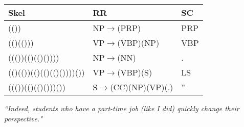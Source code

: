 \begin{frame}
{\begin{center}
    \begin{tabular}{|l|l|l|}
        \hline
        \textbf{Skel} & \textbf{RR }& \textbf{SC }\\
        \hline
         (())                      & NP$\rightarrow$(PRP)         &  PRP\\
          (()(()))                 & VP$\rightarrow$(VBP)(NP)     &  VBP\\
         ((())(()(()())))          & NP$\rightarrow$(NN)          &  .  \\
          (()(())(()(()(()())))()) & VP$\rightarrow$(VBP)(S)      &  LS \\
          ((())(()(()()))())       & S$\rightarrow$(CC)(NP)(VP)(.)&  '' \\
        \hline
    \end{tabular}
    \end{center}}

    {\normalsize
    \emph{``Indeed, students who have a part-time job (like I did) quickly
change their perspective."}}
\end{frame}
